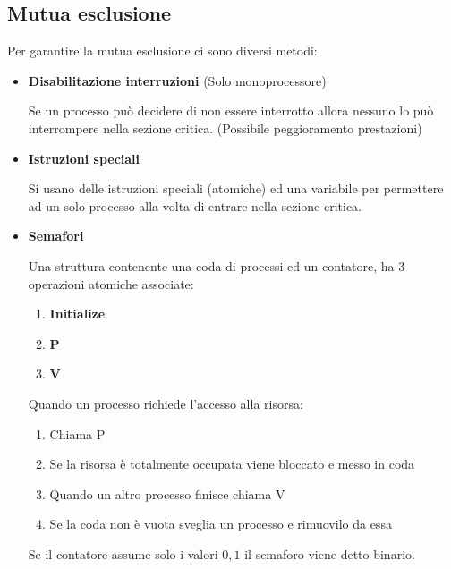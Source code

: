 \documentclass{article}
\begin{document}
\newpage

\subsection{Mutua esclusione}

Per garantire la mutua esclusione ci sono diversi metodi:
\begin{itemize}
    \item \textbf{Disabilitazione interruzioni} (Solo monoprocessore)

        Se un processo può decidere di non essere interrotto allora nessuno lo può interrompere nella sezione critica. (Possibile peggioramento prestazioni)

    \item \textbf{Istruzioni speciali}

        Si usano delle istruzioni speciali (atomiche) ed una variabile per permettere ad un solo processo alla volta di entrare nella sezione critica.

    \item \textbf{Semafori}

        Una struttura contenente una coda di processi ed un contatore, ha 3 operazioni atomiche associate:
        \begin{enumerate}
            \item \textbf{Initialize}
            \item \textbf{P}
            \item\textbf{V}
        \end{enumerate}

        Quando un processo richiede l'accesso alla risorsa:
        \begin{enumerate}
            \item Chiama P
            \item Se la risorsa è totalmente occupata viene bloccato e messo in coda
            \item Quando un altro processo finisce chiama V
            \item Se la coda non è vuota sveglia un processo e rimuovilo da essa
        \end{enumerate}

        \vspace{10pt}

        Se il contatore assume solo i valori $0,1$ il semaforo viene detto binario.

        \vspace{10pt}


\end{itemize}
\end{document}
